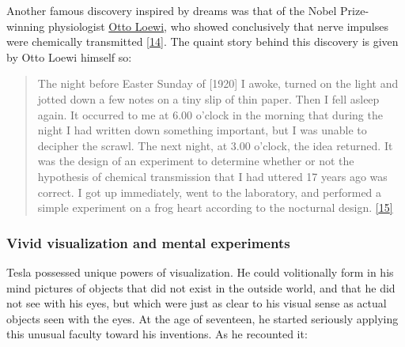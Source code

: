 \documentclass[
  12pt,
  british,
  a4paper,
  rgb,
  dvipsnames,
  svgnames,
  hyphens]{article}
\begin{document}
Another famous discovery inspired by dreams was that of the Nobel
Prize-winning physiologist
\href{https://en.wikipedia.org/wiki/Otto_Loewi}{Otto Loewi}, who showed
conclusively that nerve impulses were chemically transmitted
\protect\hyperlink{ref-justin06}{{[}14{]}}. The quaint story behind this
discovery is given by Otto Loewi himself so:

\begin{quote}
The night before Easter Sunday of {[}1920{]} I awoke, turned on the
light and jotted down a few notes on a tiny slip of thin paper. Then I
fell asleep again. It occurred to me at 6.00 o'clock in the morning that
during the night I had written down something important, but I was
unable to decipher the scrawl. The next night, at 3.00 o'clock, the idea
returned. It was the design of an experiment to determine whether or not
the hypothesis of chemical transmission that I had uttered 17 years ago
was correct. I got up immediately, went to the laboratory, and performed
a simple experiment on a frog heart according to the nocturnal design.
\protect\hyperlink{ref-loewi2014}{{[}15{]}}
\end{quote}

\hypertarget{vivid-visualization-and-mental-experiments}{%
\subsubsection{Vivid visualization and mental
experiments}\label{vivid-visualization-and-mental-experiments}}

Tesla possessed unique powers of visualization. He could volitionally
form in his mind pictures of objects that did not exist in the outside
world, and that he did not see with his eyes, but which were just as
clear to his visual sense as actual objects seen with the eyes. At the
age of seventeen, he started seriously applying this unusual faculty
toward his inventions. As he recounted it:
\end{document}
